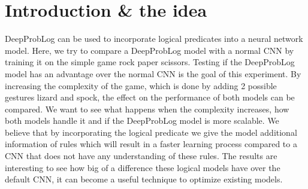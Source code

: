 \section{Introduction \& the idea}
DeepProbLog \cite{DBLP} can be used to incorporate logical predicates into a neural network model. Here, we try to compare a DeepProbLog model with a normal CNN by training it on the simple game rock paper scissors. Testing if the DeepProbLog model has an advantage over the normal CNN is the goal of this experiment. By increasing the complexity of the game, which is done by adding 2 possible gestures lizard and spock, the effect on the performance of both models can be compared. We want to see what happens when the complexity increases, how both models handle it and if the DeepProbLog model is more scalable. We believe that by incorporating the logical predicate we give the model additional information of rules which will result in a faster learning process compared to a CNN that does not have any understanding of these rules. The results are interesting to see how big of a difference these logical models have over the default CNN, it can become a useful technique to optimize existing models.
